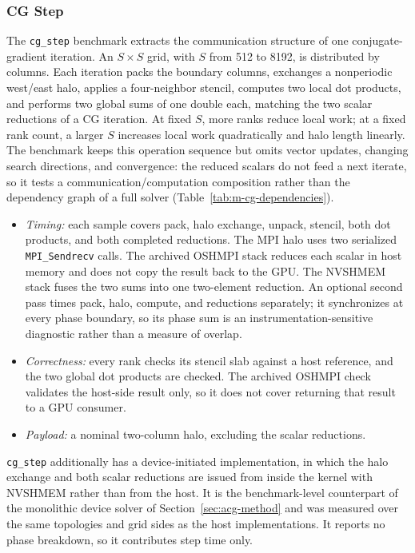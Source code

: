 \subsubsection{CG Step}

The \texttt{cg\_step} benchmark extracts the communication structure of one conjugate-gradient iteration. An $S\times S$ grid, with $S$ from 512 to 8192, is distributed by columns. Each iteration packs the boundary columns, exchanges a nonperiodic west/east halo, applies a four-neighbor stencil, computes two local dot products, and performs two global sums of one double each, matching the two scalar reductions of a CG iteration. At fixed $S$, more ranks reduce local work; at a fixed rank count, a larger $S$ increases local work quadratically and halo length linearly. The benchmark keeps this operation sequence but omits vector updates, changing search directions, and convergence: the reduced scalars do not feed a next iterate, so it tests a communication/computation composition rather than the dependency graph of a full solver (Table~\ref{tab:m-cg-dependencies}).
\begin{itemize}
    \item \emph{Timing:} each sample covers pack, halo exchange, unpack, stencil, both dot products, and both completed reductions. The MPI halo uses two serialized \texttt{MPI\_Sendrecv} calls. The archived OSHMPI stack reduces each scalar in host memory and does not copy the result back to the GPU. The NVSHMEM stack fuses the two sums into one two-element reduction. An optional second pass times pack, halo, compute, and reductions separately; it synchronizes at every phase boundary, so its phase sum is an instrumentation-sensitive diagnostic rather than a measure of overlap.
    \item \emph{Correctness:} every rank checks its stencil slab against a host reference, and the two global dot products are checked. The archived OSHMPI check validates the host-side result only, so it does not cover returning that result to a GPU consumer.
    \item \emph{Payload:} a nominal two-column halo, excluding the scalar reductions.
\end{itemize}

\texttt{cg\_step} additionally has a device-initiated implementation, in which the halo exchange and both scalar reductions are issued from inside the kernel with NVSHMEM rather than from the host. It is the benchmark-level counterpart of the monolithic device solver of Section~\ref{sec:acg-method} and was measured over the same topologies and grid sides as the host implementations. It reports no phase breakdown, so it contributes step time only.


